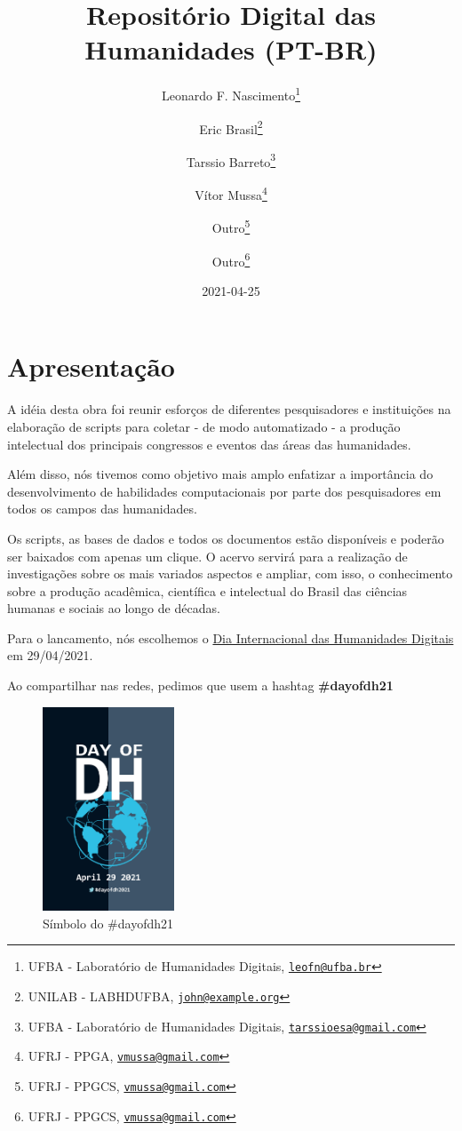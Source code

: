 \documentclass[
]{book}
\title{Repositório Digital das Humanidades (PT-BR)}
\author{Leonardo F. Nascimento\footnote{UFBA - Laboratório de Humanidades Digitais, \href{mailto:leofn@ufba.br}{\nolinkurl{leofn@ufba.br}}} \and Eric Brasil\footnote{UNILAB - LABHDUFBA, \href{mailto:john@example.org}{\nolinkurl{john@example.org}}} \and Tarssio Barreto\footnote{UFBA - Laboratório de Humanidades Digitais, \href{mailto:tarssioesa@gmail.com}{\nolinkurl{tarssioesa@gmail.com}}} \and Vítor Mussa\footnote{UFRJ - PPGA, \href{mailto:vmussa@gmail.com}{\nolinkurl{vmussa@gmail.com}}} \and Outro\footnote{UFRJ - PPGCS, \href{mailto:vmussa@gmail.com}{\nolinkurl{vmussa@gmail.com}}} \and Outro\footnote{UFRJ - PPGCS, \href{mailto:vmussa@gmail.com}{\nolinkurl{vmussa@gmail.com}}}}
\date{2021-04-25}
\begin{document}
\maketitle

{
\setcounter{tocdepth}{1}
\tableofcontents
}
\hypertarget{apresentauxe7uxe3o}{%
\chapter{Apresentação}\label{apresentauxe7uxe3o}}

A idéia desta obra foi reunir esforços de diferentes pesquisadores e instituições na elaboração de scripts para coletar - de modo automatizado - a produção intelectual dos principais congressos e eventos das áreas das humanidades.

Além disso, nós tivemos como objetivo mais amplo enfatizar a importância do desenvolvimento de habilidades computacionais por parte dos pesquisadores em todos os campos das humanidades.

Os scripts, as bases de dados e todos os documentos estão disponíveis e poderão ser baixados com apenas um clique. O acervo servirá para a realização de investigações sobre os mais variados aspectos e ampliar, com isso, o conhecimento sobre a produção acadêmica, científica e intelectual do Brasil das ciências humanas e sociais ao longo de décadas.

Para o lancamento, nós escolhemos o \href{https://dhcenternet.org/initiatives/day-of-dh/2021}{Dia Internacional das Humanidades Digitais} em 29/04/2021.

Ao compartilhar nas redes, pedimos que usem a hashtag \textbf{\#dayofdh21}

\begin{figure}
\centering
\includegraphics[width=0.35\textwidth,height=\textheight]{./img/dayofdh.jpg}
\caption{Símbolo do \#dayofdh21}
\end{figure}
\end{document}
